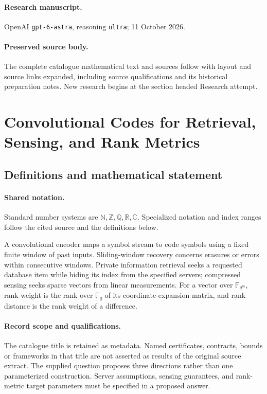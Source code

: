 \documentclass[11pt]{article}
\begin{document}
\paragraph{Research manuscript.} OpenAI \texttt{gpt-6-astra}, reasoning \texttt{ultra}; 11 October 2026.
\paragraph{Preserved source body.} The complete catalogue mathematical text and sources follow with layout and source links expanded, including source qualifications and its historical preparation notes. New research begins at the section headed Research attempt.

\section{Convolutional Codes for Retrieval, Sensing, and Rank Metrics}\label{statement}

\subsection{Definitions and mathematical statement}

\paragraph{Shared notation.}Standard number systems are $\mathbb N,\mathbb Z,\mathbb Q,\mathbb R,\mathbb C$. Specialized notation and index ranges follow the cited source and the definitions below.


A convolutional encoder maps a symbol stream to code symbols using a fixed finite window of past inputs. Sliding-window recovery concerns erasures or errors within consecutive windows. Private information retrieval seeks a requested database item while hiding its index from the specified servers; compressed sensing seeks sparse vectors from linear measurements. For a vector over $\mathbb F_{q^m}$, rank weight is the rank over $\mathbb F_q$ of its coordinate-expansion matrix, and rank distance is the rank weight of a difference.
\paragraph{Record scope and qualifications.}
The catalogue title is retained as metadata. Named certificates, contracts, bounds or frameworks in that title are not asserted as results of the original source extract.
The supplied question proposes three directions rather than one parameterized construction. Server assumptions, sensing guarantees, and rank-metric target parameters must be specified in a proposed answer.
\end{document}
